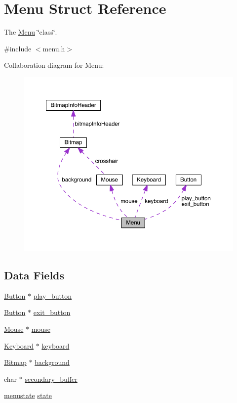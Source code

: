 \hypertarget{struct_menu}{}\section{Menu Struct Reference}
\label{struct_menu}


The \hyperlink{struct_menu}{Menu} \char`\"{}class\char`\"{}.  




{\ttfamily \#include $<$menu.\+h$>$}



Collaboration diagram for Menu\+:
\nopagebreak
\begin{figure}[H]
\begin{center}
\leavevmode
\includegraphics[width=350pt]{struct_menu__coll__graph}
\end{center}
\end{figure}
\subsection*{Data Fields}
\begin{DoxyCompactItemize}
\item 
\hyperlink{struct_button}{Button} $\ast$ \hyperlink{struct_menu_a17eeafa4c78aca8816c6aee85ce3a836}{play\+\_\+button}
\item 
\hyperlink{struct_button}{Button} $\ast$ \hyperlink{struct_menu_a173a61ec5be315a84389cc08d3852abe}{exit\+\_\+button}
\item 
\hyperlink{struct_mouse}{Mouse} $\ast$ \hyperlink{struct_menu_a2514b83cbae6998a57eae74a24f6faf4}{mouse}
\item 
\hyperlink{struct_keyboard}{Keyboard} $\ast$ \hyperlink{struct_menu_a945ceeb6236fbaf00dcdb7a0109f0d40}{keyboard}
\item 
\hyperlink{struct_bitmap}{Bitmap} $\ast$ \hyperlink{struct_menu_a15de70574bc710486bf129a5c8f1634e}{background}
\item 
char $\ast$ \hyperlink{struct_menu_a1820f1e9a26c0253b13be1df94052ca1}{secondary\+\_\+buffer}
\item 
\hyperlink{group__menu_ga187fcd377cc0b403aaec48d4cfdc559a}{menustate} \hyperlink{struct_menu_aa42946365311ec5aa5a3ab71b9c52968}{state}
\end{DoxyCompactItemize}



